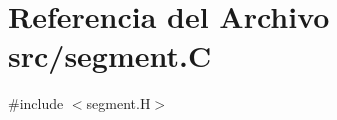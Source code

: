 \hypertarget{segment_8_c}{}\section{Referencia del Archivo src/segment.C}
\label{segment_8_c}
{\ttfamily \#include $<$segment.\+H$>$}\newline
